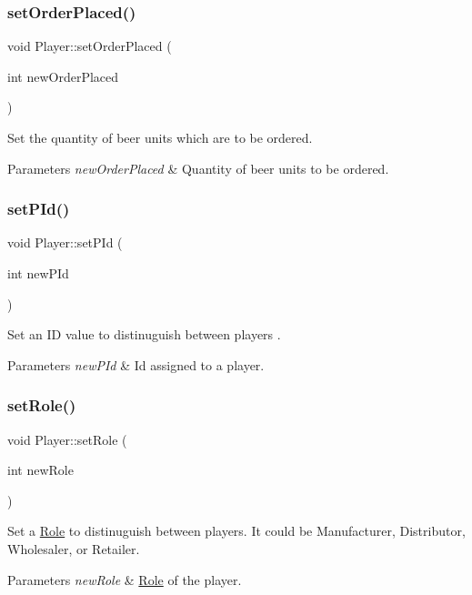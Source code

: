 \subsubsection{\texorpdfstring{set\+Order\+Placed()}{setOrderPlaced()}}
{\footnotesize\ttfamily void Player\+::set\+Order\+Placed (\begin{DoxyParamCaption}\item[{int}]{new\+Order\+Placed }\end{DoxyParamCaption})}

Set the quantity of beer units which are to be ordered. 
\begin{DoxyParams}{Parameters}
{\em new\+Order\+Placed} & Quantity of beer units to be ordered. \\
\hline
\end{DoxyParams}
\mbox{\label{classPlayer_a17e0bd230257e3026226e46a4ab4dc11}} 
\subsubsection{\texorpdfstring{set\+P\+Id()}{setPId()}}
{\footnotesize\ttfamily void Player\+::set\+P\+Id (\begin{DoxyParamCaption}\item[{int}]{new\+P\+Id }\end{DoxyParamCaption})}

Set an ID value to distinuguish between players . 
\begin{DoxyParams}{Parameters}
{\em new\+P\+Id} & Id assigned to a player. \\
\hline
\end{DoxyParams}
\mbox{\label{classPlayer_ad15e1ac6cf80b1492d69a37d7cfb7372}} 
\subsubsection{\texorpdfstring{set\+Role()}{setRole()}}
{\footnotesize\ttfamily void Player\+::set\+Role (\begin{DoxyParamCaption}\item[{int}]{new\+Role }\end{DoxyParamCaption})}

Set a \hyperlink{classRole}{Role} to distinuguish between players. It could be Manufacturer, Distributor, Wholesaler, or Retailer. 
\begin{DoxyParams}{Parameters}
{\em new\+Role} & \hyperlink{classRole}{Role} of the player. \\
\hline
\end{DoxyParams}
\mbox{\label{classPlayer_a99b3fcf7fa83e14419716b090892d6c8}} 
